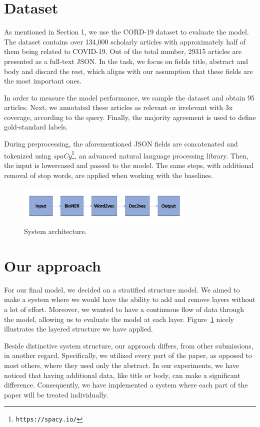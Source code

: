 \documentclass[10pt, a4paper]{article}
\begin{document}
	\section{Dataset}
	
	As mentioned in Section 1, we use the CORD-19 dataset to evaluate the model. The dataset contains over 134,000 scholarly articles with approximately half of them being related to COVID-19. Out of the total number, 29315 articles are presented as a full-text JSON. In the task, we focus on fields title, abstract and body and discard the rest, which aligns with our assumption that these fields are the most important ones.
	
	In order to measure the model performance, we sample the dataset and obtain 95 articles. Next, we annotated these articles as relevant or irrelevant with 3x coverage, according to the query. Finally, the majority agreement is used to define gold-standard labels.  
	
	During preprocessing, the aforementioned JSON fields are concatenated and tokenized using \emph{spaCy}\footnote{\texttt{https://spacy.io/}}, an advanced natural language processing library. Then, the input is lowercased and passed to the model. The same steps, with additional removal of stop words, are applied when working with the baselines.
	
	\begin{figure}[h]
		\centering
		\includegraphics[width=8.5cm]{model}
		\caption{ System architecture.}
		\label{figure:model1}
	\end{figure}
	
	\section{Our approach}
	
	For our final model, we decided on a stratified structure model. We aimed to make a system where we would have the ability to add and remove layers without a lot of effort. Moreover, we wanted to have a continuous flow of data through the model, allowing us to evaluate the model at each layer. Figure~\ref{figure:model1} nicely illustrates the layered structure we have applied. 
	
	Beside distinctive system structure, our approach differs, from other submissions, in another regard. Specifically, we utilized every part of the paper, as opposed to most others, where they used only the abstract. In our experiments, we have noticed that having additional data, like title or body, can make a significant difference. Consequently, we have implemented a system where each part of the paper will be treated individually. 
	
\end{document}
